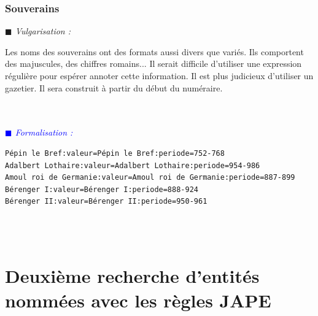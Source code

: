 \documentclass[a4paper, 11pt]{report}
\newenvironment{vulgarisation}
    {
    \textit{\textcolor{dark-blue}{$\blacksquare$  Vulgarisation : \\}}

    }
    {
    ~\\~\\
    }
\newenvironment{formalisation}
    {
    \textit{\textcolor{blue}{$\blacksquare$  Formalisation : \\}}
    }
    {
    ~\\~\\
    }
\begin{document}
\subsubsection{Souverains}
\begin{vulgarisation}
    Les noms des souverains ont des formats aussi divers que variés. Ils comportent des majuscules, des chiffres romains... Il serait difficile d'utiliser une expression régulière pour espérer annoter cette information. Il est plus judicieux d'utiliser un gazetier. Il sera construit à partir du début du numéraire. 
\end{vulgarisation}
\begin{formalisation}
\begin{verbatim}
Pépin le Bref:valeur=Pépin le Bref:periode=752-768
Adalbert Lothaire:valeur=Adalbert Lothaire:periode=954-986
Amoul roi de Germanie:valeur=Amoul roi de Germanie:periode=887-899
Bérenger I:valeur=Bérenger I:periode=888-924
Bérenger II:valeur=Bérenger II:periode=950-961
\end{verbatim}
\end{formalisation}

    \section{Deuxième recherche d'entités nommées avec les règles JAPE}
\end{document}
